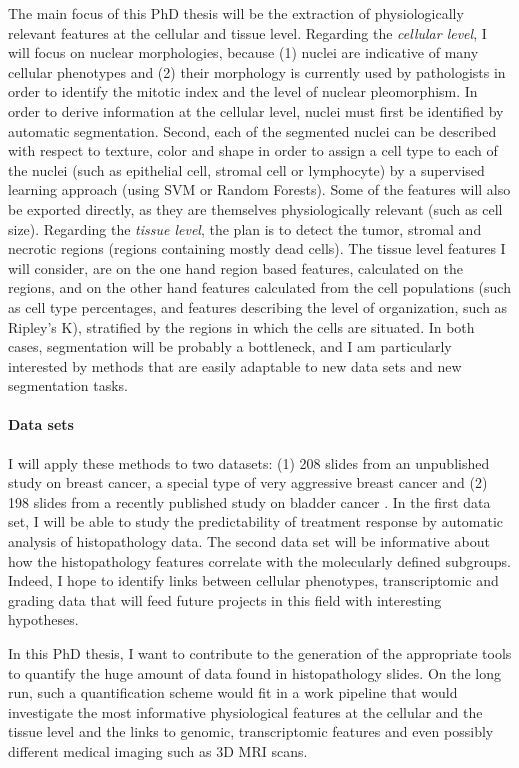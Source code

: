 \documentclass[a4paper,10pt]{article}
\begin{document}
The main focus of this PhD thesis will be the extraction of
physiologically relevant features at the cellular and tissue
level. Regarding the {\em cellular level}, I will focus on nuclear morphologies,
because (1) nuclei are indicative of many cellular
phenotypes\citep{Chow2012} and (2) their morphology is currently used by
pathologists in order to identify the mitotic index and the level of
nuclear pleomorphism\citep{Elston1991}. In order to derive information
at the cellular level, nuclei must first be identified by automatic
segmentation. Second, each of the segmented nuclei can be described
with respect to texture, color and shape in order to assign a cell
type to each of the nuclei (such as epithelial cell, stromal cell or
lymphocyte) by a supervised learning approach (using SVM or Random
Forests). Some of the features will also be exported directly, as they
are themselves physiologically relevant (such as cell size). 
Regarding the {\em tissue level}, the plan is to detect the tumor,
stromal and necrotic regions (regions containing mostly dead
cells). The tissue level features I will consider, are on the one hand
region based features, calculated on the regions, and on the other
hand features calculated from the cell populations (such as cell type
percentages, and features describing the level of organization, such
as Ripley's K), stratified by the regions in which the cells are situated. 
In both cases, segmentation will be probably a bottleneck, and I am
particularly interested by methods that are easily adaptable to new
data sets and new segmentation tasks.

\paragraph{Data sets}

I will apply these methods to
two datasets: (1) 208 slides from an unpublished study on breast
cancer, a special type of very aggressive breast cancer  and (2) 198
slides from a recently published study on bladder cancer
\citep{biton2014independent}. In the first data set, I will be able to
study the predictability of treatment response by automatic
analysis of histopathology data. The second data set will be
informative about how the histopathology features correlate with the
molecularly defined subgroups. Indeed, I hope to identify links between
cellular phenotypes, transcriptomic and grading data that will feed
future projects in this field with interesting hypotheses. 

In this PhD thesis, I want to contribute to the generation of the
appropriate tools to quantify the huge amount of data found in
histopathology slides. On the long run, such a
 quantification scheme would fit in a work pipeline that would
 investigate the most informative physiological features at the
 cellular and the tissue level and the links
 to genomic, transcriptomic features and even possibly different
 medical imaging such as 3D MRI scans. 
\end{document}
